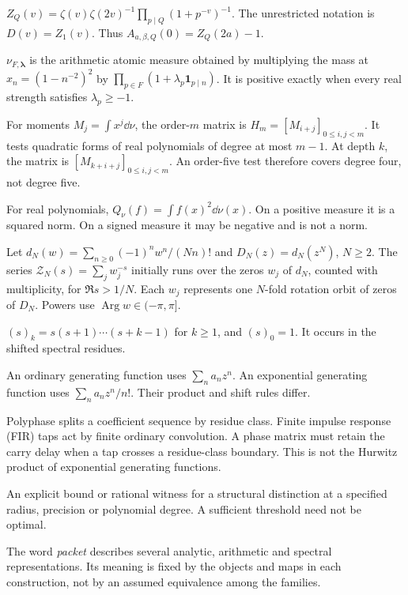\begin{description}
$Z_Q(v)=\zeta(v)\zeta(2v)^{-1}\prod_{p\mid Q}(1+p^{-v})^{-1}$.
The unrestricted notation is $D(v)=Z_1(v)$. Thus
$A_{a,\beta,Q}(0)=Z_Q(2a)-1$.
\item[Prime-sieve measure.] $\nu_{F,\boldsymbol\lambda}$ is the arithmetic
atomic measure obtained by multiplying the mass at $x_n=(1-n^{-2})^2$ by
$\prod_{p\in F}(1+\lambda_p\mathbf1_{p\mid n})$.
It is positive exactly when every real strength satisfies $\lambda_p\ge-1$.
\item[Hankel order and polynomial degree.] For moments $M_j=\int x^j\dd\nu$,
the order-$m$ matrix is $H_m=[M_{i+j}]_{0\le i,j<m}$.
It tests quadratic forms of real polynomials of degree at most $m-1$.
At depth $k$, the matrix is $[M_{k+i+j}]_{0\le i,j<m}$.
An order-five test therefore covers degree four, not degree five.
\item[Signed quadratic form.] For real polynomials,
$Q_\nu(f)=\int f(x)^2\dd\nu(x)$. On a positive measure it is a squared
norm. On a signed measure it may be negative and is not a norm.
\item[Orbit spectral zeta $\mathcal Z_N$.] Let
$d_N(w)=\sum_{n\ge0}(-1)^nw^n/(Nn)!$ and $D_N(z)=d_N(z^N)$, $N\ge2$.
The series $\mathcal Z_N(s)=\sum_jw_j^{-s}$ initially runs over the zeros
$w_j$ of $d_N$, counted with multiplicity, for $\Re s>1/N$.
Each $w_j$ represents one $N$-fold rotation orbit of zeros of $D_N$.
Powers use $\operatorname{Arg}w\in(-\pi,\pi]$.
\item[Rising factorial.] $(s)_k=s(s+1)\cdots(s+k-1)$ for $k\ge1$, and
$(s)_0=1$. It occurs in the shifted spectral residues.
\item[Coefficient conventions.] An ordinary generating function uses
$\sum_na_nz^n$. An exponential generating function uses
$\sum_na_nz^n/n!$. Their product and shift rules differ.
\item[Polyphase section and finite taps.] Polyphase splits a coefficient
sequence by residue class. Finite impulse response (FIR) taps act by finite
ordinary convolution. A phase matrix must retain the carry delay when a tap
crosses a residue-class boundary. This is not the Hurwitz product of
exponential generating functions.
\item[Resolution certificate.] An explicit bound or rational witness for a
structural distinction at a specified radius, precision or polynomial
degree. A sufficient threshold need not be optimal.
\end{description}

The word \emph{packet} describes several analytic, arithmetic and spectral
representations. Its meaning is fixed by the objects and maps in each
construction, not by an assumed equivalence among the families.
